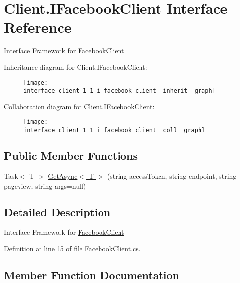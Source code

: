 \hypertarget{interface_client_1_1_i_facebook_client}{}\section{Client.\+I\+Facebook\+Client Interface Reference}
\label{interface_client_1_1_i_facebook_client}


Interface Framework for \hyperlink{class_client_1_1_facebook_client}{Facebook\+Client}  




Inheritance diagram for Client.\+I\+Facebook\+Client\+:
\nopagebreak
\begin{figure}[H]
\begin{center}
\leavevmode
\texttt{[image: interface\_client\_1\_1\_i\_facebook\_client\_\_inherit\_\_graph]}
\end{center}
\end{figure}


Collaboration diagram for Client.\+I\+Facebook\+Client\+:
\nopagebreak
\begin{figure}[H]
\begin{center}
\leavevmode
\texttt{[image: interface\_client\_1\_1\_i\_facebook\_client\_\_coll\_\_graph]}
\end{center}
\end{figure}
\subsection*{Public Member Functions}
\begin{DoxyCompactItemize}
\item 
Task$<$ T $>$ \hyperlink{interface_client_1_1_i_facebook_client_adcc547867f709ce07787df58233c0b85}{Get\+Async$<$ T $>$} (string access\+Token, string endpoint, string pageview, string args=null)
\end{DoxyCompactItemize}


\subsection{Detailed Description}
Interface Framework for \hyperlink{class_client_1_1_facebook_client}{Facebook\+Client} 



Definition at line 15 of file Facebook\+Client.\+cs.



\subsection{Member Function Documentation}
